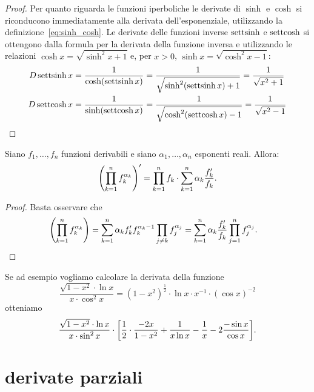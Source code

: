 \begin{proof}
Per quanto riguarda le funzioni iperboliche le derivate di $\sinh$
e $\cosh$ si riconducono immediatamente alla derivata dell'esponenziale,
utilizzando
la definizione~\eqref{eq:sinh_cosh}. Le derivate delle funzioni
inverse $\operatorname{settsinh}$ e $\operatorname{settcosh}$ si ottengono dalla formula per la derivata
della funzione inversa e utilizzando
le relazioni $\cosh x = \sqrt{\sinh^2 x+1}$ e, per $x > 0$,
$\sinh x = \sqrt{\cosh^2 x -1}$:
\begin{align*}
  D \operatorname{settsinh} x &= \frac{1}{\cosh(\operatorname{settsinh} x)}
  = \frac{1}{\sqrt{\sinh^2 (\operatorname{settsinh} x) + 1}} = \frac{1}{\sqrt{x^2+1}}\\
  D \operatorname{settcosh} x &= \frac{1}{\sinh(\operatorname{settcosh} x)}
  = \frac{1}{\sqrt{\cosh^2(\operatorname{settcosh} x)-1}}
  = \frac{1}{\sqrt{x^2-1}}
\end{align*}
\end{proof}

\begin{proposition}
Siano $f_1,\dots, f_n$ funzioni derivabili e siano $\alpha_1,\dots, \alpha_n$ 
esponenti reali. Allora:
  \[
  {\left( \prod_{k=1}^n f_k^{\alpha_k} \right)}'
  = \prod_{k=1}^n f_k \cdot \sum_{k=1}^n \alpha_k \frac{f_k'}{f_k}.
  \]
\end{proposition}
\begin{proof}
Basta osservare che 
\begin{align*}
  {\left( \prod_{k=1}^n f_k^{\alpha_k} \right)}
  &= \sum_{k=1}^n \alpha_k f_k' f_k^{\alpha_k-1} \prod_{j\neq k} f_j^{\alpha_j}
  = \sum_{k=1}^n \alpha_k \frac{f_k'}{f_k} \prod_{j=1}^n f_j^{\alpha_j}.
\end{align*}
\end{proof}
Se ad esempio vogliamo calcolare la derivata della funzione 
\[
 \frac{\sqrt{1-x^2}\cdot \ln x}{x\cdot \cos^2 x}
 = (1-x^2)^{\frac 1 2} \cdot \ln x \cdot x^{-1}\cdot (\cos x)^{-2}
\]
otteniamo 
\[
  \frac{\sqrt{1-x^2}\cdot \ln x}{x\cdot \sin^2 x}
  \cdot {\left[ \frac 1 2 \cdot \frac{-2x}{1-x^2} + \frac{1}{x\ln x} - \frac{1}{x}-2\frac{-\sin x}{\cos x} \right]}.
\]

\section{derivate parziali}

